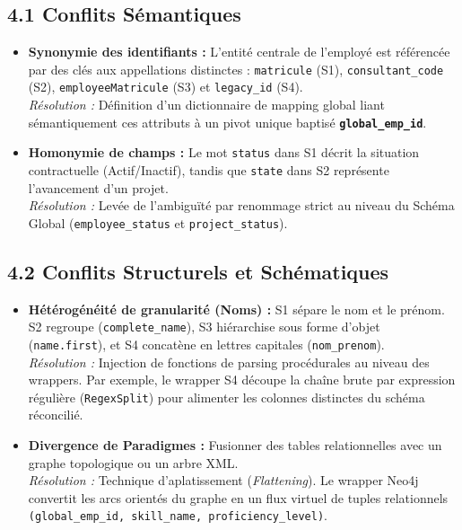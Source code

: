\documentclass[11pt,a4paper]{article}
\begin{document}
\subsection{4.1 Conflits Sémantiques}
\begin{itemize}
    \item \textbf{Synonymie des identifiants :} L'entité centrale de l'employé est référencée par des clés aux appellations distinctes : \texttt{matricule} (S1), \texttt{consultant\_code} (S2), \texttt{employeeMatricule} (S3) et \texttt{legacy\_id} (S4). 
    \\ \textit{Résolution :} Définition d'un dictionnaire de mapping global liant sémantiquement ces attributs à un pivot unique baptisé \textbf{\texttt{global\_emp\_id}}.
    \item \textbf{Homonymie de champs :} Le mot \texttt{status} dans S1 décrit la situation contractuelle (Actif/Inactif), tandis que \texttt{state} dans S2 représente l'avancement d'un projet.
    \\ \textit{Résolution :} Levée de l'ambiguïté par renommage strict au niveau du Schéma Global (\texttt{employee\_status} et \texttt{project\_status}).
\end{itemize}

\subsection{4.2 Conflits Structurels et Schématiques}
\begin{itemize}
    \item \textbf{Hétérogénéité de granularité (Noms) :} S1 sépare le nom et le prénom. S2 regroupe (\texttt{complete\_name}), S3 hiérarchise sous forme d'objet (\texttt{name.first}), et S4 concatène en lettres capitales (\texttt{nom\_prenom}).
    \\ \textit{Résolution :} Injection de fonctions de parsing procédurales au niveau des wrappers. Par exemple, le wrapper S4 découpe la chaîne brute par expression régulière (\texttt{RegexSplit}) pour alimenter les colonnes distinctes du schéma réconcilié.
    \item \textbf{Divergence de Paradigmes :} Fusionner des tables relationnelles avec un graphe topologique ou un arbre XML.
    \\ \textit{Résolution :} Technique d'aplatissement (\textit{Flattening}). Le wrapper Neo4j convertit les arcs orientés du graphe en un flux virtuel de tuples relationnels \texttt{(global\_emp\_id, skill\_name, proficiency\_level)}.
\end{itemize}
\end{document}
